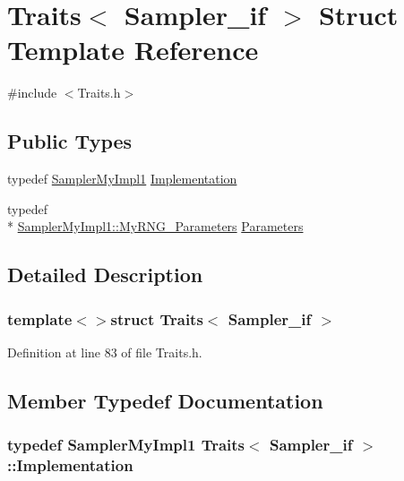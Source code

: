 \hypertarget{struct_traits_3_01_sampler__if_01_4}{\section{Traits$<$ Sampler\-\_\-if $>$ Struct Template Reference}
\label{struct_traits_3_01_sampler__if_01_4}
}


{\ttfamily \#include $<$Traits.\-h$>$}

\subsection*{Public Types}
\begin{DoxyCompactItemize}
\item 
typedef \hyperlink{class_sampler_my_impl1}{Sampler\-My\-Impl1} \hyperlink{struct_traits_3_01_sampler__if_01_4_aabc4648655c0f3f075ddf4c2a8ca0140}{Implementation}
\item 
typedef \\*
\hyperlink{class_sampler_my_impl1_1_1_my_r_n_g___parameters}{Sampler\-My\-Impl1\-::\-My\-R\-N\-G\-\_\-\-Parameters} \hyperlink{struct_traits_3_01_sampler__if_01_4_a4ad2f3625d3d6fc6cfb35de363d5594e}{Parameters}
\end{DoxyCompactItemize}


\subsection{Detailed Description}
\subsubsection*{template$<$$>$struct Traits$<$ Sampler\-\_\-if $>$}



Definition at line 83 of file Traits.\-h.



\subsection{Member Typedef Documentation}
\hypertarget{struct_traits_3_01_sampler__if_01_4_aabc4648655c0f3f075ddf4c2a8ca0140}{
\subsubsection[{Implementation}]{\setlength{\rightskip}{0pt plus 5cm}typedef {\bf Sampler\-My\-Impl1} {\bf Traits}$<$ {\bf Sampler\-\_\-if} $>$\-::{\bf Implementation}}}\label{struct_traits_3_01_sampler__if_01_4_aabc4648655c0f3f075ddf4c2a8ca0140}


